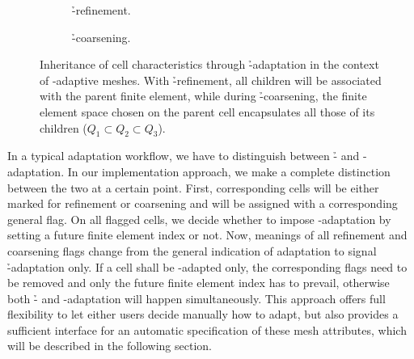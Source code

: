 \begin{figure}
\begin{subfigure}{.5\textwidth}
  \centering
  
  \caption{\h-refinement.}
\end{subfigure}
\begin{subfigure}{.5\textwidth}
  \centering
  
  \caption{\h-coarsening.}
\end{subfigure}
\caption[Inheritance of cell characteristics through \h-adaptation.]{Inheritance of cell characteristics through \h-adaptation in the context of \hp-adaptive meshes. With \h-refinement, all children will be associated with the parent finite element, while during \h-coarsening, the finite element space chosen on the parent cell encapsulates all those of its children ($Q_1 \subset Q_2 \subset Q_3$).}
\label{fig:adaptation}
\end{figure}

In a typical adaptation workflow, we have to distinguish between \h- and \p-adaptation. In our implementation approach, we make a complete distinction between the two at a certain point. First, corresponding cells will be either marked for refinement or coarsening and will be assigned with a corresponding general flag. On all flagged cells, we decide whether to impose \p-adaptation by setting a future finite element index or not. Now, meanings of all refinement and coarsening flags change from the general indication of adaptation to signal \h-adaptation only. If a cell shall be \p-adapted only, the corresponding flags need to be removed and only the future finite element index has to prevail, otherwise both \h- and \p-adaptation will happen simultaneously. This approach offers full flexibility to let either users decide manually how to adapt, but also provides a sufficient interface for an automatic specification of these mesh attributes, which will be described in the following section.